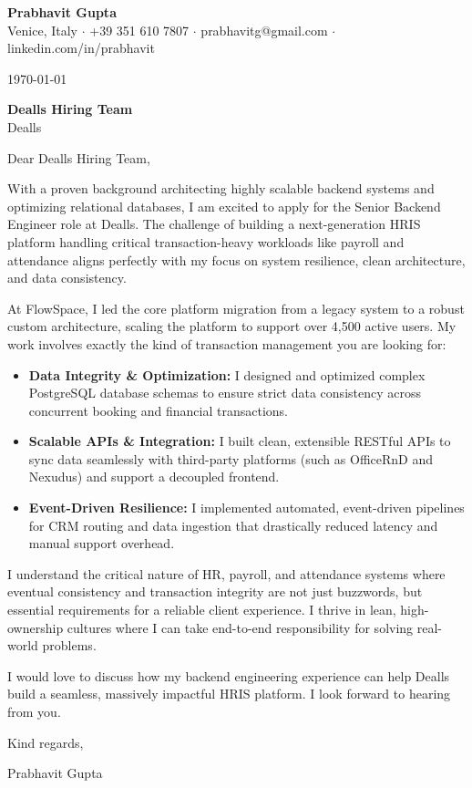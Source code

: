 \documentclass[a4paper,11pt]{article}
\begin{document}
\begin{center}
    {\Large \textbf{Prabhavit Gupta}} \\
    Venice, Italy $\cdot$ +39 351 610 7807 $\cdot$ prabhavitg@gmail.com $\cdot$ linkedin.com/in/prabhavit
\end{center}
\vspace{2em}

\today

\textbf{Dealls Hiring Team} \\
Dealls

\vspace{1.5em}
Dear Dealls Hiring Team,

With a proven background architecting highly scalable backend systems and optimizing relational databases, I am excited to apply for the Senior Backend Engineer role at Dealls. The challenge of building a next-generation HRIS platform handling critical transaction-heavy workloads like payroll and attendance aligns perfectly with my focus on system resilience, clean architecture, and data consistency.

At FlowSpace, I led the core platform migration from a legacy system to a robust custom architecture, scaling the platform to support over 4,500 active users. My work involves exactly the kind of transaction management you are looking for:

\begin{itemize}
    \item \textbf{Data Integrity \& Optimization:} I designed and optimized complex PostgreSQL database schemas to ensure strict data consistency across concurrent booking and financial transactions.
    \item \textbf{Scalable APIs \& Integration:} I built clean, extensible RESTful APIs to sync data seamlessly with third-party platforms (such as OfficeRnD and Nexudus) and support a decoupled frontend.
    \item \textbf{Event-Driven Resilience:} I implemented automated, event-driven pipelines for CRM routing and data ingestion that drastically reduced latency and manual support overhead.
\end{itemize}

I understand the critical nature of HR, payroll, and attendance systems where eventual consistency and transaction integrity are not just buzzwords, but essential requirements for a reliable client experience. I thrive in lean, high-ownership cultures where I can take end-to-end responsibility for solving real-world problems.

I would love to discuss how my backend engineering experience can help Dealls build a seamless, massively impactful HRIS platform. I look forward to hearing from you.

Kind regards,

\vspace{1em}
Prabhavit Gupta
\end{document}
